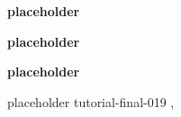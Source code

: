 \begin{bio}
\small

{\bfseries placeholder}

{\bfseries placeholder}

{\bfseries placeholder}


\end{bio}

\begin{tutorial}
  {placeholder}
  {tutorial-final-019}
  {\daydateyear, \tutorialafternoontime}
  {\TutLocD}



\end{tutorial}
